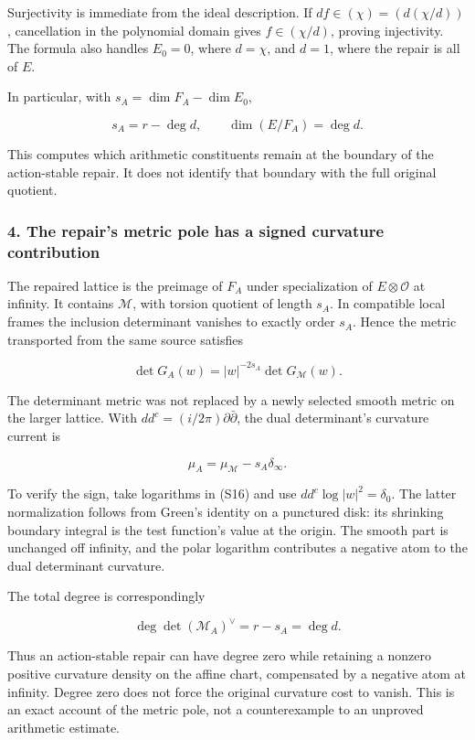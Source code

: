 Surjectivity is immediate from the ideal description. If \(df\in(\chi)=(d(\chi/d))\), cancellation in the polynomial domain gives \(f\in(\chi/d)\), proving injectivity. The formula also handles \(E_0=0\), where \(d=\chi\), and \(d=1\), where the repair is all of \(E\).

In particular, with \(s_A=\dim F_A-\dim E_0\),

\[
\boxed{s_A=r-\deg d,\qquad \dim(E/F_A)=\deg d.}
\tag{S15}
\]

This computes which arithmetic constituents remain at the boundary of the action-stable repair. It does not identify that boundary with the full original quotient.

\subsubsection{4. The repair's metric pole has a signed curvature contribution}\label{endpoint-cc_specialization--the-repairs-metric-pole-has-a-signed-curvature-contribution}

The repaired lattice is the preimage of \(F_A\) under specialization of \(E\otimes\mathcal O\) at infinity. It contains \(\mathscr M\), with torsion quotient of length \(s_A\). In compatible local frames the inclusion determinant vanishes to exactly order \(s_A\). Hence the metric transported from the same source satisfies

\[
\det G_A(w)=|w|^{-2s_A}\det G_{\mathscr M}(w).
\tag{S16}
\]

The determinant metric was not replaced by a newly selected smooth metric on the larger lattice. With \(dd^c=(i/2\pi)\partial\bar\partial\), the dual determinant's curvature current is

\[
\boxed{\mu_A=\mu_{\mathscr M}-s_A\delta_\infty.}
\tag{S17}
\]

To verify the sign, take logarithms in (S16) and use \(dd^c\log|w|^2=\delta_0\). The latter normalization follows from Green's identity on a punctured disk: its shrinking boundary integral is the test function's value at the origin. The smooth part is unchanged off infinity, and the polar logarithm contributes a negative atom to the dual determinant curvature.

The total degree is correspondingly

\[
\deg\det(\mathscr M_A)^\vee=r-s_A=\deg d.
\tag{S18}
\]

Thus an action-stable repair can have degree zero while retaining a nonzero positive curvature density on the affine chart, compensated by a negative atom at infinity. Degree zero does not force the original curvature cost to vanish. This is an exact account of the metric pole, not a counterexample to an unproved arithmetic estimate.

